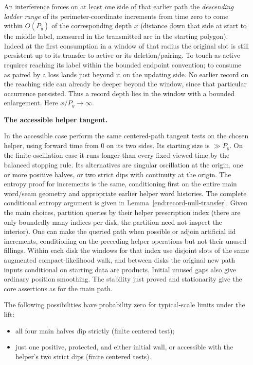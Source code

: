 An interference forces on at least one side of that earlier path the \emph{descending
ladder range} of its perimeter-coordinate increments from time zero to come within
\(O(P_y)\) of the corresponding depth \(x\) (distance down that side at start to the
middle label, measured in the transmitted arc in the starting polygon). Indeed at the
first consumption in a window of that radius the original slot is still persistent up to
its transfer to active or its deletion/pairing. To touch as active requires reaching its
label within the bounded endpoint convention; to consume as paired by a loss lands just
beyond it on the updating side. No earlier record on the reaching side can already be
deeper beyond the window, since that particular occurrence persisted. Thus a record depth
lies in the window with a bounded enlargement. Here \(x/P_y\to\infty\).

\smallskip
\noindent\textbf{The accessible helper tangent.}\quad

In the accessible case perform the same centered-path tangent tests on the chosen helper,
using forward time from 0 on its two sides. Its starting size is \(\gg P_y\). On the
finite-oscillation case it runs longer than every fixed viewed time by the balanced
stopping rule. Its alternatives are singular oscillation at the origin, one or more
positive halves, or two strict dips with continuity at the origin. The entropy proof for
increments is the same, conditioning first on the entire main word/seam geometry and
appropriate earlier helper word histories. The complete conditional entropy argument is
given in Lemma~\ref{end:record-null-transfer}. Given the main choices,
partition queries by their helper prescription index (there are only boundedly many
indices per disk, the partition need not inspect the interior). One can make the queried
path when possible or adjoin artificial iid increments, conditioning on the preceding
helper operations but not their unused fillings. Within each disk the windows for that
index use disjoint slots of the same augmented compact-likelihood walk, and between disks
the original new path inputs conditional on starting data are products. Initial unused
gaps also give ordinary position smoothing. The stability just proved and stationarity
give the core assertions as for the main path.

\begin{proposition}\label{end:passage-exclusion}

The following possibilities have probability zero for typical-scale limits under the lift:

\begin{itemize}
\item
  all four main halves dip strictly (finite centered test);
\item
  just one positive, protected, and either initial wall, or accessible with the helper's
  two strict dips (finite centered tests).
\end{itemize}

\end{proposition}

